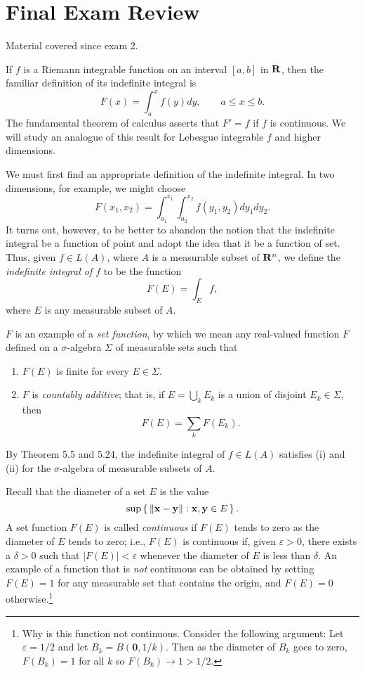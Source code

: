 \section{Final Exam Review}
Material covered since exam 2.

\bigskip

If $f$ is a Riemann integrable function on an interval $[a,b]$ in $\mathbf{R}$,
then the familiar definition of its indefinite integral is
\[
F(x)=\int_a^x f(y)dy,\qquad a\leq x\leq b.
\]
The fundamental theorem of calculus asserts that $F'=f$ if $f$ is
continuous. We will study an analogue of this result for Lebesgue
integrable $f$ and higher dimensions.

We must first find an appropriate definition of the indefinite integral. In
two dimensions, for example, we might choose
\[
F(x_1,x_2)=\int_{a_1}^{x_1}\int_{a_2}^{x_2}f(y_1,y_2)dy_1dy_2.
\]
It turns out, however, to be better to abandon the notion that the
indefinite integral be a function of point and adopt the idea that it be a
function of set. Thus, given $f\in L(A)$, where $A$ is a measurable
subset of $\mathbf{R}^n$, we define the \emph{indefinite integral of $f$} to be
the function
\[
F(E)=\int_E f,
\]
where $E$ is any measurable subset of $A$.

$F$ is an example of a \emph{set function}, by which we mean any
real-valued function $F$ defined on a $\sigma$-algebra $\Sigma$ of
measurable sets such that
\begin{enumerate}[label=(\roman*)]
\item $F(E)$ is finite for every $E\in\Sigma$.
\item $F$ is \emph{countably additive}; that is, if $E=\bigcup_k E_k$ is a
  union of disjoint $E_k\in\Sigma$, then
\[
F(E)=\sum_k F(E_k).
\]
\end{enumerate}
By Theorem 5.5 and 5.24, the indefinite integral of $f\in L(A)$ satisfies
(i) and (ii) for the $\sigma$-algebra of measurable subsets of $A$.

Recall that the diameter of a set $E$ is the value
\[
\sup\left\{\,\|\mathbf{x}-\mathbf{y}\|:\mathbf{x},\mathbf{y}\in E\,\right\}.
\]
A set function $F(E)$ is called \emph{continuous} if $F(E)$ tends to zero
as the diameter of $E$ tends to zero; i.e., $F(E)$ is continuous if, given
$\varepsilon>0$, there exists a $\delta>0$ such that $|F(E)|<\varepsilon$
whenever the diameter of $E$ is less than $\delta$. An example of a
function that is \emph{not} continuous can be obtained by setting $F(E)=1$
for any measurable set that contains the origin, and $F(E)=0$
otherwise.\footnote{Why is this function not continuous. Consider the
  following argument: Let $\varepsilon=1/2$ and let $B_k=
  B(\mathbf{0},1/k)$. Then as the diameter of $B_k$ goes to zero,
  $F(B_k)=1$ for all $k$ so $F(B_k)\to 1>1/2$.}

